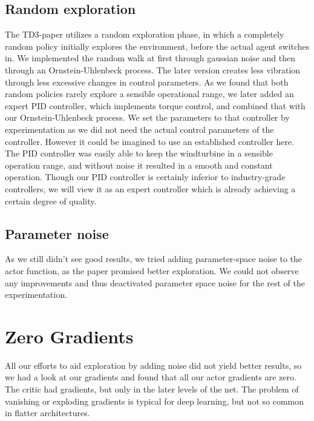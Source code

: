 \documentclass[hyperref,german,beleg]{cgvpub}
\begin{document}
\subsection{Random exploration}

The TD3-paper \cite{fujimotoAddressingFunctionApproximation2018} utilizes a random exploration phase, in which a completely random policy \cite{mozerDiscoveringStructureReactive1990} initially explores the environment, before the actual agent switches in. We implemented the random walk at first through gaussian noise and then through an Ornstein-Uhlenbeck process. The later version creates less vibration through less excessive changes in control parameters. As we found that both random policies rarely explore a sensible operational range, we later added an expert PID controller, which implements torque control, and combined that with our Ornstein-Uhlenbeck process. We set the parameters to that controller by experimentation as we did not need the actual control parameters of the controller. However it could be imagined to use an established controller here. The PID controller was easily able to keep the windturbine in a sensible operation range, and without noise it resulted in a smooth and constant operation. Though our PID controller is certainly inferior to industry-grade controllers, we will view it as an expert controller which is already achieving a certain degree of quality.

\subsection{Parameter noise}

As we still didn't see good results, we tried adding parameter-space noise \cite{plappertParameterSpaceNoise2017} to the actor function, as the paper promised better exploration. We could not observe any improvements and thus deactivated parameter space noise for the rest of the experimentation.

\section{Zero Gradients}
All our efforts to aid exploration by adding noise did not yield better results, so we had a look at our gradients and found that all our actor gradients are zero. The critic had gradients, but only in the later levels of the net. The problem of vanishing or exploding gradients is typical for deep learning, but not so common in flatter architectures.
\end{document}
